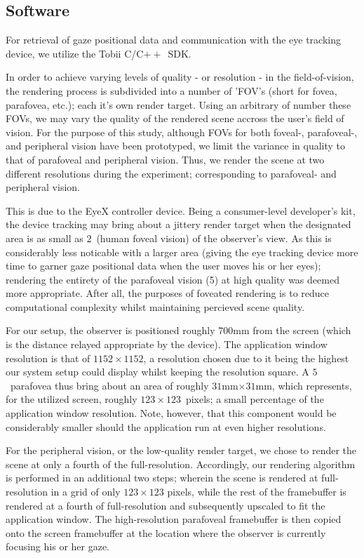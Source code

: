 \subsection{Software}
For retrieval of gaze positional data and communication with the eye tracking device, we utilize the Tobii C/C$++$~SDK.

In order to achieve varying levels of quality - or resolution - in the field-of-vision, the rendering process is subdivided into a number of 'FOV's (short for fovea, parafovea, etc.); each it's own render target.
Using an arbitrary of number these FOVs, we may vary the quality of the rendered scene accross the user's field of vision.
For the purpose of this study, although FOVs for both foveal-, parafoveal-, and peripheral vision have been prototyped, we limit the variance in quality to that of parafoveal and peripheral vision.
Thus, we render the scene at two different resolutions during the experiment; corresponding to parafoveal- and peripheral vision.

This is due to the EyeX controller device.
Being a consumer-level developer's kit, the device tracking may bring about a jittery render target when the designated area is as small as $2$\degree\ (human foveal vision) of the observer's view.
As this is considerably less noticable with a larger area (giving the eye tracking device more time to garner gaze positional data when the user moves his or her eyes); rendering the entirety of the parafoveal vision (5\degree ) at high quality was deemed more appropriate.
After all, the purposes of foveated rendering is to reduce computational complexity whilst maintaining percieved scene quality.

For our setup, the observer is positioned roughly 700mm from the screen (which is the distance relayed appropriate by the device).
The application window resolution is that of $1152\times 1152$, a resolution chosen due to it being the highest our system setup could display whilst keeping the resolution square.
A $5$\degree\ parafovea thus bring about an area of roughly $31$mm$\times $$31$mm, which represents, for the utilized screen, roughly $123\times 123$~pixels; a small percentage of the application window resolution.
Note, however, that this component would be considerably smaller should the application run at even higher resolutions.

For the peripheral vision, or the low-quality render target, we chose to render the scene at only a fourth of the full-resolution.
Accordingly, our rendering algorithm is performed in an additional two steps; wherein the scene is rendered at full-resolution in a grid of only $123\times 123$ pixels, while the rest of the framebuffer is rendered at a fourth of full-resolution and subsequently upscaled to fit the application window.
The high-resolution parafoveal framebuffer is then copied onto the screen framebuffer at the location where the observer is currently focusing his or her gaze.

